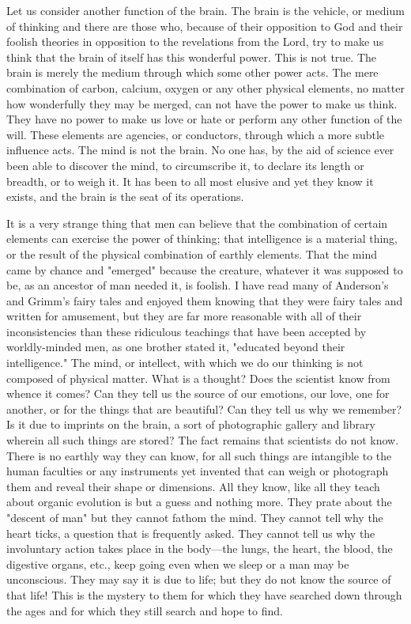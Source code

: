 Let us consider another function of the brain. The brain is the vehicle, or medium of thinking
and there are those who, because of their opposition to God and their foolish theories in
opposition to the revelations from the Lord, try to make us think that the brain of itself has
this wonderful power. This is not true. The brain is merely the medium through which some
other power acts. The mere combination of carbon, calcium, oxygen or any other physical
elements, no matter how wonderfully they may be merged, can not have the power to make
us think. They have no power to make us love or hate or perform any other function of the
will. These elements are agencies, or conductors, through which a more subtle influence acts.
The mind is not the brain. No one has, by the aid of science ever been able to discover the
mind, to circumscribe it, to declare its length or breadth, or to weigh it. It has been to all most
elusive and yet they know it exists, and the brain is the seat of its operations.

It is a very strange thing that men can believe that the combination of certain elements can
exercise the power of thinking; that intelligence is a material thing, or the result of the
physical combination of earthly elements. That the mind came by chance and "emerged"
because the creature, whatever it was supposed to be, as an ancestor of man needed it, is
foolish. I have read many of Anderson's and Grimm's fairy tales and enjoyed them knowing
that they were fairy tales and written for amusement, but they are far more reasonable with
all of their inconsistencies than these ridiculous teachings that have been accepted by
worldly-minded men, as one brother stated it, "educated beyond their intelligence." The
mind, or intellect, with which we do our thinking is not composed of physical matter. What is
a thought? Does the scientist know from whence it comes? Can they tell us the source of our
emotions, our love, one for another, or for the things that are beautiful? Can they tell us why
we remember? Is it due to imprints on the brain, a sort of photographic gallery and library
wherein all such things are stored? The fact remains that scientists do not know. There is no
earthly way they can know, for all such things are intangible to the human faculties or any
instruments yet invented that can weigh or photograph them and reveal their shape or
dimensions. All they know, like all they teach about organic evolution is but a guess and
nothing more. They prate about the "descent of man" but they cannot fathom the mind. They
cannot tell why the heart ticks, a question that is frequently asked. They cannot tell us why
the involuntary action takes place in the body—the lungs, the heart, the blood, the digestive
organs, etc., keep going even when we sleep or a man may be unconscious. They may say it
is due to life; but they do not know the source of that life! This is the mystery to them for
which they have searched down through the ages and for which they still search and hope to
find.

